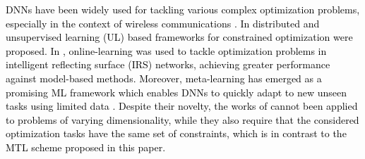 \textcolor{black}{ DNNs have  been widely used for tackling various complex optimization problems, especially in the context of wireless communications \cite{d2,d4,d8,online2,online1}.  In \cite{d2,d4,d8} distributed and unsupervised learning (UL) based frameworks for constrained optimization were proposed. In \cite{online1}, online-learning was used to tackle optimization problems in intelligent reflecting surface (IRS) networks, achieving greater performance against model-based methods. Moreover, meta-learning has emerged as a promising ML framework which enables DNNs to quickly adapt to new unseen tasks  using limited data \cite{rev4, rev6}.  Despite their novelty, the works of \cite{rev4, rev6}  cannot been applied to problems of varying dimensionality, while they also require that  the considered optimization tasks have the same set of constraints, which is in contrast to the MTL scheme proposed in this paper.}
